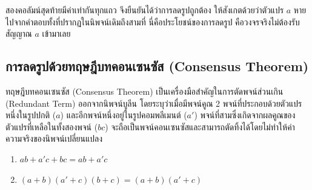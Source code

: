 สองคอลัมน์สุดท้ายมีค่าเท่ากันทุกแถว จึงยืนยันได้ว่าการลดรูปถูกต้อง ให้สังเกตด้วยว่าตัวแปร $a$ หายไปจากคำตอบทั้งที่ปรากฏในนิพจน์เดิมถึงสามที่ นี่คือประโยชน์ของการลดรูป คือวงจรจริงไม่ต้องรับสัญญาณ $a$ เข้ามาเลย

\subsection{การลดรูปด้วยทฤษฎีบทคอนเซนซัส (Consensus Theorem)}
ทฤษฎีบทคอนเซนซัส (Consensus Theorem) เป็นเครื่องมือสำคัญในการตัดพจน์ส่วนเกิน (Redundant Term) ออกจากนิพจน์บูลีน โดยระบุว่าเมื่อมีพจน์คูณ 2 พจน์ที่ประกอบด้วยตัวแปรหนึ่งในรูปปกติ ($a$) และอีกพจน์หนึ่งอยู่ในรูปคอมพลีเมนต์ ($a'$) พจน์ที่สามซึ่งเกิดจากผลคูณของตัวแปรที่เหลือในทั้งสองพจน์ ($bc$) จะถือเป็นพจน์คอนเซนซัสและสามารถตัดทิ้งได้โดยไม่ทำให้ค่าความจริงของนิพจน์เปลี่ยนแปลง~\parencite{rosen2019discrete}

\begin{thrm}
\begin{enumerate}
    \item $a b + a' c + b c = a b + a' c$
    \item $(a + b)(a' + c)(b + c) = (a + b)(a' + c)$
\end{enumerate}
\end{thrm}

